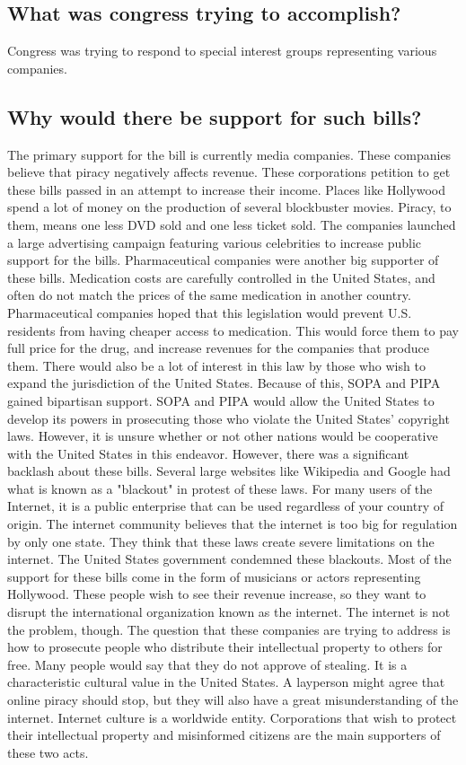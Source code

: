 \documentclass[11pt,journal,compsoc]{IEEEtran}
\begin{document}
\subsection{What was congress trying to accomplish?}
Congress was trying to respond to special interest groups representing various companies. 

\subsection{Why would there be support for such bills?}
The primary support for the bill is currently media companies. These companies believe that piracy negatively affects revenue. These corporations petition to get these bills passed in an attempt to increase their income. Places like Hollywood spend a lot of money on the production of several blockbuster movies. Piracy, to them, means one less DVD sold and one less ticket sold. The companies launched a large advertising campaign featuring various celebrities to increase public support for the bills. 
Pharmaceutical companies were another big supporter of these bills. Medication costs are carefully controlled in the United States, and often do not match the prices of the same medication in another country. Pharmaceutical companies hoped that this legislation would prevent U.S. residents from having cheaper access to medication. This would force them to pay full price for the drug, and increase revenues for the companies that produce them. 
There would also be a lot of interest in this law by those who wish to expand the jurisdiction of the United States. Because of this, SOPA and PIPA gained bipartisan support.  SOPA and PIPA would allow the United States to develop its powers in prosecuting those who violate the United States' copyright laws. However, it is unsure whether or not other nations would be cooperative with the United States in this endeavor. 
However, there was a significant backlash about these bills. Several large websites like Wikipedia and Google had what is known as a "blackout" in protest of these laws. For many users of the Internet, it is a public enterprise that can be used regardless of your country of origin. The internet community believes that the internet is too big for regulation by only one state. They think that these laws create severe limitations on the internet. The United States government condemned these blackouts. 
Most of the support for these bills come in the form of musicians or actors representing Hollywood. These people wish to see their revenue increase, so they want to disrupt the international organization known as the internet. The internet is not the problem, though. The question that these companies are trying to address is how to prosecute people who distribute their intellectual property to others for free. Many people would say that they do not approve of stealing. It is a characteristic cultural value in the United States. A layperson might agree that online piracy should stop, but they will also have a great misunderstanding of the internet. Internet culture is a worldwide entity. Corporations that wish to protect their intellectual property and misinformed citizens are the main supporters of these two acts.
\end{document}
